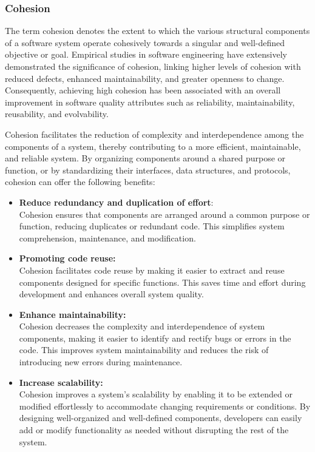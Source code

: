 \subsubsection{Cohesion} \label{subsubsec:on_cohesion}

The term cohesion denotes the extent to which the various structural components of a
software system operate cohesively towards a singular and well-defined objective or goal.
Empirical studies in software engineering have extensively demonstrated the significance
of cohesion, linking higher levels of cohesion with reduced defects, enhanced
maintainability, and greater openness to change. Consequently, achieving high cohesion has
been associated with an overall improvement in software quality attributes such as
reliability, maintainability, reusability, and evolvability.

Cohesion facilitates the reduction of complexity and interdependence among the components
of a system, thereby contributing to a more efficient, maintainable, and reliable system.
By organizing components around a shared purpose or function, or by standardizing their
interfaces, data structures, and protocols, cohesion can offer the following benefits:

\begin{itemize}
    \item \textbf{Reduce redundancy and duplication of effort}: \\
    Cohesion ensures that components are arranged around a common purpose or function,
    reducing duplicates or redundant code. This simplifies system comprehension,
    maintenance, and modification.
    \item \textbf{Promoting code reuse:}\\
    Cohesion facilitates code reuse by making it easier to extract and reuse components
    designed for specific functions. This saves time and effort during development and
    enhances overall system quality.
    \item \textbf{Enhance maintainability:}\\
    Cohesion decreases the complexity and interdependence of system components, making it
    easier to identify and rectify bugs or errors in the code. This improves system
    maintainability and reduces the risk of introducing new errors during maintenance.
    \item \textbf{Increase scalability:}\\
    Cohesion improves a system's scalability by enabling it to be extended or modified
    effortlessly to accommodate changing requirements or conditions. By designing
    well-organized and well-defined components, developers can easily add or modify
    functionality as needed without disrupting the rest of the system.  
\end{itemize}

